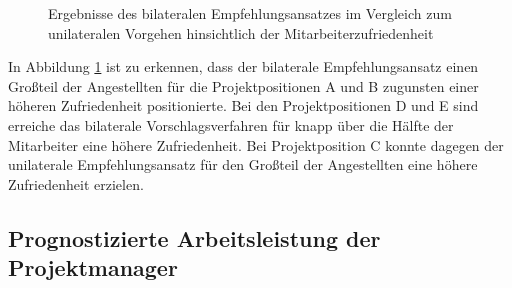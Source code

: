 \begin{figure}[h]
	\caption{Ergebnisse des bilateralen Empfehlungsansatzes im Vergleich zum unilateralen Vorgehen hinsichtlich der Mitarbeiterzufriedenheit}
	\label{fig:ergebnisse:analyse:abb7}
\end{figure}

In Abbildung \ref{fig:ergebnisse:analyse:abb7} ist zu erkennen, dass der bilaterale Empfehlungsansatz einen Großteil der Angestellten für die Projektpositionen A und B zugunsten einer höheren Zufriedenheit positionierte. Bei den Projektpositionen D und E sind erreiche das bilaterale Vorschlagsverfahren für knapp über die Hälfte der Mitarbeiter eine höhere Zufriedenheit. Bei Projektposition C konnte dagegen der unilaterale Empfehlungsansatz für den Großteil der Angestellten eine höhere Zufriedenheit erzielen.

\subsection{Prognostizierte Arbeitsleistung der Projektmanager}
\label{ch:ergebnisse:fallstudie:arbeitsleistung}
